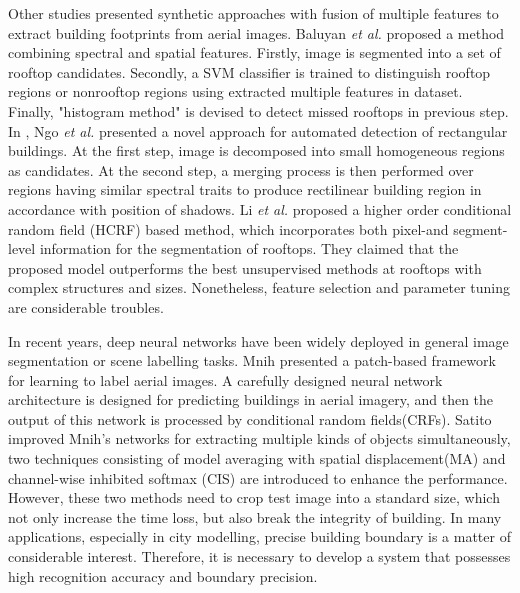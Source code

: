 \documentclass[runningheads]{llncs}
\begin{document}
   Other studies presented synthetic approaches with fusion of multiple features to extract building footprints from aerial images. Baluyan \textit{et al.} \cite{baluyan2013novel} proposed a method combining spectral and spatial features. Firstly, image is segmented into a set of rooftop candidates. Secondly, a SVM classifier is trained to distinguish rooftop regions or nonrooftop regions using extracted multiple features in dataset. Finally, "histogram method" is devised to detect missed rooftops in previous step. In \cite{ngoautomatic}, Ngo \textit{et al.} presented a novel approach for automated detection of rectangular buildings. At the first step, image is decomposed into small homogeneous regions as candidates. At the second step, a merging process is then performed over regions having similar spectral traits to produce rectilinear building region in accordance with position of shadows. Li \textit{et al.} \cite{li2015robust} proposed a higher order conditional random field (HCRF) based method, which incorporates both pixel-and segment-level information for the segmentation of rooftops. They claimed that the proposed model outperforms the best unsupervised methods at rooftops with complex structures and sizes. Nonetheless, feature selection and parameter tuning are considerable troubles.
    
   In recent years, deep neural networks have been widely deployed in general image segmentation or scene labelling tasks. Mnih \cite{Mnih2013Machine} presented a patch-based framework for learning to label aerial images. A carefully designed neural network architecture is designed for predicting buildings in aerial imagery, and then the output of this network is processed by conditional random fields(CRFs). Satito \cite{Saito2016Multiple} improved Mnih's networks for extracting multiple kinds of objects simultaneously, two techniques consisting of model averaging with spatial displacement(MA) and channel-wise inhibited softmax (CIS) are introduced to enhance the  performance. 
However, these two methods need to crop test image into a standard size, which not only  increase the time loss, but also break the integrity of building. In many applications, especially in city modelling, precise building boundary is a matter of considerable interest.  Therefore, it is necessary to develop a system that possesses high recognition accuracy and  boundary precision.
   
\end{document}

